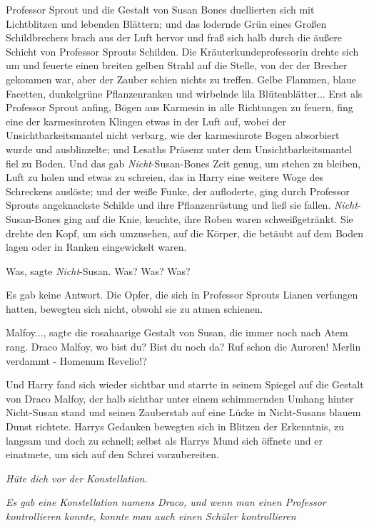 Professor Sprout und die Gestalt von Susan Bones duellierten sich mit
Lichtblitzen und lebenden Blättern; und das lodernde Grün eines Großen
Schildbrechers brach aus der Luft hervor und fraß sich halb durch die äußere
Schicht von Professor Sprouts Schilden. Die Kräuterkundeprofessorin drehte sich
um und feuerte einen breiten gelben Strahl auf die Stelle, von der der Brecher
gekommen war, aber der Zauber schien nichts zu treffen. Gelbe Flammen, blaue
Facetten, dunkelgrüne Pflanzenranken und wirbelnde lila Blütenblätter... Erst
als Professor Sprout anfing, Bögen aus Karmesin in alle Richtungen zu feuern,
fing eine der karmesinroten Klingen etwas in der Luft auf, wobei der
Unsichtbarkeitsmantel nicht verbarg, wie der karmesinrote Bogen absorbiert wurde
und ausblinzelte; und Lesaths Präsenz unter dem Unsichtbarkeitsmantel fiel zu
Boden. Und das gab \emph{Nicht}-Susan-Bones Zeit genug, um stehen zu bleiben,
Luft zu holen und etwas zu schreien, das in Harry eine weitere Woge des
Schreckens auslöste; und der weiße Funke, der aufloderte, ging durch Professor
Sprouts angeknackste Schilde und ihre Pflanzenrüstung und ließ sie fallen.
\emph{Nicht}-Susan-Bones ging auf die Knie, keuchte, ihre Roben waren
schweißgetränkt. Sie drehte den Kopf, um sich umzusehen, auf die Körper, die
betäubt auf dem Boden lagen oder in Ranken eingewickelt waren.

\glqq{}Was\grqq{}, sagte \emph{Nicht}-Susan. \glqq{}Was? Was? Was?\grqq{}

Es gab keine Antwort. Die Opfer, die sich in Professor Sprouts Lianen verfangen
hatten, bewegten sich nicht, obwohl sie zu atmen schienen.

\glqq{}Malfoy...\grqq{}, sagte die rosahaarige Gestalt von Susan, die immer noch
nach Atem rang. \glqq{}Draco Malfoy, wo bist du? Bist du noch da? Ruf schon die
Auroren! Merlin verdammt - Homenum Revelio!?\grqq{}

Und Harry fand sich wieder sichtbar und starrte in seinem Spiegel auf die
Gestalt von Draco Malfoy, der halb sichtbar unter einem schimmernden Umhang
hinter Nicht-Susan stand und seinen Zauberstab auf eine Lücke in Nicht-Susans
blauem Dunst richtete. Harrys Gedanken bewegten sich in Blitzen der Erkenntnis,
zu langsam und doch zu schnell; selbst als Harrys Mund sich öffnete und er
einatmete, um sich auf den Schrei vorzubereiten.

\emph{Hüte dich vor der Konstellation.}

\emph{Es gab eine Konstellation namens Draco, und wenn man einen Professor
kontrollieren konnte, konnte man auch einen Schüler kontrollieren}

